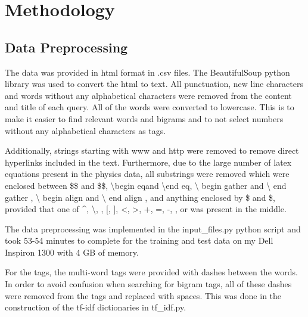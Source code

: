 \documentclass{article}
\begin{document}

\section{Methodology}

\subsection{Data Preprocessing}
\label{subsec:pre_process}

The data was provided in html format in .csv files. The BeautifulSoup python
library was used to convert the html to text. All punctuation, new line
characters and words without any alphabetical characters were removed from the
content and title of each query. All of the words were converted to
lowercase. This is to make it easier to find relevant words and bigrams and to
not select numbers without any alphabetical characters as tags.

Additionally, strings starting with www and http were removed to remove direct
hyperlinks included in the text. Furthermore, due to the large number of latex
equations present in the physics data, all substrings were removed which were
enclosed between \$\$ and \$\$, \textbackslash begin \textbraceleft eq\textasteriskcentered \textbraceright and \textbackslash end\textbraceleft
eq\textasteriskcentered \textbraceright, \textbackslash
begin \textbraceleft gather \textbraceright and \textbackslash
end \textbraceleft gather \textbraceright, \textbackslash
begin \textbraceleft align \textbraceright and \textbackslash
end \textbraceleft align \textbraceright, and anything enclosed by \$
and \$, provided that one of \^{}, \textbackslash, \textbraceleft, [, ],
\textless, \textgreater, +, =, -, \textasteriskcentered, or \textunderscore
was present in the middle. 

The data preprocessing was implemented in the input\_files.py python script
and took 53-54 minutes to complete for the training and test data on my Dell
Inspiron 1300 with 4 GB of memory.

For the tags, the multi-word tags were provided with dashes between the
words. In order to avoid confusion when searching for bigram tags, all of
these dashes were removed from the tags and replaced with spaces. This was
done in the construction of the tf-idf dictionaries in tf\_idf.py.
\end{document}
